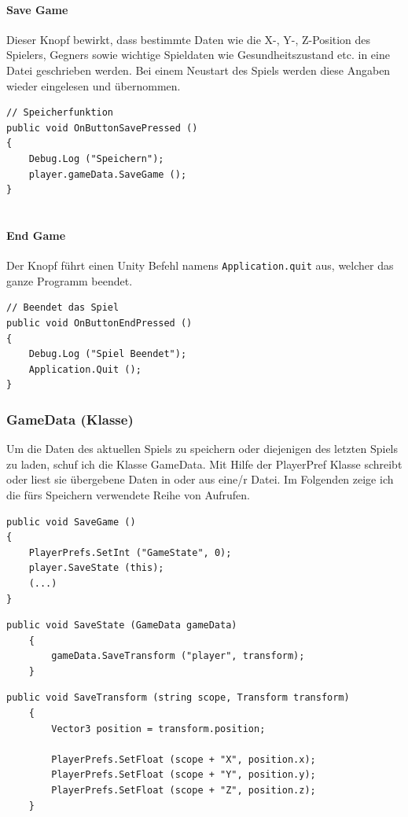 \paragraph{Save Game}
Dieser Knopf bewirkt, dass bestimmte Daten wie die X-, Y-, Z-Position des Spielers, Gegners sowie wichtige Spieldaten wie Gesundheitszustand etc. in eine Datei geschrieben werden. Bei einem Neustart des Spiels werden diese Angaben wieder eingelesen und übernommen.

\begin{lstlisting}[caption={Save Game}]
// Speicherfunktion
public void OnButtonSavePressed ()
{
	Debug.Log ("Speichern");
	player.gameData.SaveGame ();
}
	
\end{lstlisting}

\paragraph{End Game}
Der Knopf führt einen Unity Befehl namens \lstinline{Application.quit}  aus, welcher das ganze Programm beendet. 

\begin{lstlisting}[caption={End Game}]
// Beendet das Spiel
public void OnButtonEndPressed ()
{
	Debug.Log ("Spiel Beendet");
	Application.Quit ();
}
\end{lstlisting}

\subsubsection{GameData (Klasse)}
Um die Daten des aktuellen Spiels zu speichern oder diejenigen des letzten Spiels zu laden, schuf ich die Klasse GameData.
Mit Hilfe der PlayerPref Klasse schreibt oder liest sie übergebene Daten in oder aus eine/r Datei. 
Im Folgenden zeige ich die fürs Speichern verwendete Reihe von Aufrufen.
\begin{lstlisting}[caption={Methode zur Speicherung des Spielstandes in GameData}]
public void SaveGame ()
{
	PlayerPrefs.SetInt ("GameState", 0);
	player.SaveState (this);
	(...)
}
\end{lstlisting}


\begin{lstlisting}[caption={Methode SaveState in Player}]
	public void SaveState (GameData gameData)
	{
		gameData.SaveTransform ("player", transform);
	}
\end{lstlisting}

\begin{lstlisting}[caption={Methode SaveTransform in GameData}]
	public void SaveTransform (string scope, Transform transform)
	{
		Vector3 position = transform.position;

		PlayerPrefs.SetFloat (scope + "X", position.x);
		PlayerPrefs.SetFloat (scope + "Y", position.y);
		PlayerPrefs.SetFloat (scope + "Z", position.z);
	}
\end{lstlisting}

